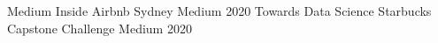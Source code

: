 \begin{cvhonors}
  \cvhonor
    {Medium}
    {Inside Airbnb Sydney}
    {Medium}
    {2020}
  \cvhonor
    {Towards Data Science}
    {Starbucks Capstone Challenge}
    {Medium}
    {2020}
\end{cvhonors}

